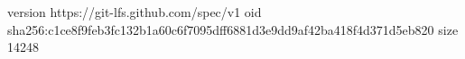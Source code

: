 version https://git-lfs.github.com/spec/v1
oid sha256:c1ce8f9feb3fc132b1a60c6f7095dff6881d3e9dd9af42ba418f4d371d5eb820
size 14248
